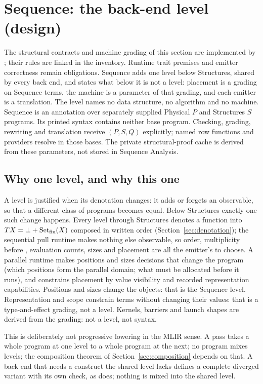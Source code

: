\section{Sequence: the back-end level (design)}
\label{sec:backend-ir}\label{sec:sequence}
The structural contracts and machine grading of this section are implemented
by ; their rules are linked in the inventory. Runtime
trait premises and emitter correctness remain obligations. Sequence adds
one level below Structures, shared by every back end,
and states what below it is not a level: placement is a grading on Sequence
terms, the machine is a parameter of that grading, and each emitter is a
translation. The level names no data structure, no algorithm and no machine.
Sequence is an annotation over separately supplied Physical $P$ and Structures
$S$ programs. Its printed syntax contains neither base program. Checking,
grading, rewriting and translation receive $(P,S,Q)$ explicitly; named row
functions and providers resolve in those bases. The private structural-proof
cache is derived from these parameters, not stored in Sequence Analysis.

\subsection{Why one level, and why this one}
A level is justified when its denotation changes: it adds or forgets an
observable, so that a different class of programs becomes equal. Below
Structures exactly one such change happens. Every level through Structures
denotes a function into $T X=\bot+\mathrm{Set}_{\rm fin}(X)$ composed in
written order (Section~\ref{sec:denotation}); the sequential pull runtime
makes nothing else observable, so order, multiplicity before ,
evaluation counts, sizes and placement are all the emitter's to choose. A
parallel runtime makes positions and sizes decisions that change the
program (which positions form the parallel domain; what must be allocated
before it runs), and constrains placement by value visibility and recorded
representation capabilities. Positions and sizes change the objects: that is
the Sequence level. Representation and scope constrain terms without changing
their values: that is a type-and-effect grading, not a level.
Kernels, barriers and launch shapes are derived from the grading: not a level, not syntax.

This is deliberately not progressive lowering in the MLIR sense. A pass
takes a whole program at one level to a whole program at the next; no
program mixes levels; the composition theorem of
Section~\ref{sec:composition} depends on that. A back end that needs a
construct the shared level lacks defines a complete diverged variant with
its own check, as  does; nothing is mixed into the shared
level.


